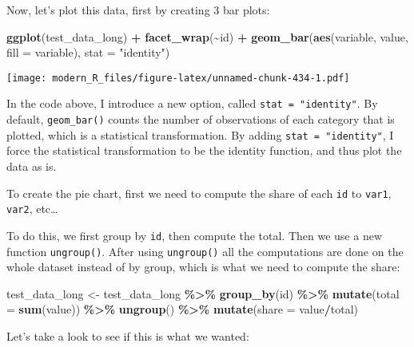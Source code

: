 \documentclass[
]{article}
\newenvironment{Shaded}{\begin{snugshade}}{\end{snugshade}}
\newcommand{\DataTypeTok}[1]{\textcolor[rgb]{0.13,0.29,0.53}{#1}}
\newcommand{\KeywordTok}[1]{\textcolor[rgb]{0.13,0.29,0.53}{\textbf{#1}}}
\newcommand{\NormalTok}[1]{#1}
\newcommand{\OperatorTok}[1]{\textcolor[rgb]{0.81,0.36,0.00}{\textbf{#1}}}
\newcommand{\StringTok}[1]{\textcolor[rgb]{0.31,0.60,0.02}{#1}}
\begin{document}
Now, let's plot this data, first by creating 3 bar plots:

\begin{Shaded}
\begin{Highlighting}[]
\KeywordTok{ggplot}\NormalTok{(test\_data\_long) }\OperatorTok{+}
\StringTok{  }\KeywordTok{facet\_wrap}\NormalTok{(}\OperatorTok{\textasciitilde{}}\NormalTok{id) }\OperatorTok{+}
\StringTok{  }\KeywordTok{geom\_bar}\NormalTok{(}\KeywordTok{aes}\NormalTok{(variable, value, }\DataTypeTok{fill =}\NormalTok{ variable), }\DataTypeTok{stat =} \StringTok{"identity"}\NormalTok{)}
\end{Highlighting}
\end{Shaded}

\texttt{[image: modern\_R\_files/figure-latex/unnamed-chunk-434-1.pdf]}

In the code above, I introduce a new option, called \texttt{stat\ =\ "identity"}. By default, \texttt{geom\_bar()} counts
the number of observations of each category that is plotted, which is a statistical transformation.
By adding \texttt{stat\ =\ "identity"}, I force the statistical transformation to be the identity function, and
thus plot the data as is.

To create the pie chart, first we need to compute the share of each \texttt{id} to \texttt{var1}, \texttt{var2}, etc\ldots{}

To do this, we first group by \texttt{id}, then compute the total. Then we use a new function \texttt{ungroup()}.
After using \texttt{ungroup()} all the computations are done on the whole dataset instead of by group, which
is what we need to compute the share:

\begin{Shaded}
\begin{Highlighting}[]
\NormalTok{test\_data\_long \textless{}{-}}\StringTok{ }\NormalTok{test\_data\_long }\OperatorTok{\%\textgreater{}\%}
\StringTok{  }\KeywordTok{group\_by}\NormalTok{(id) }\OperatorTok{\%\textgreater{}\%}
\StringTok{  }\KeywordTok{mutate}\NormalTok{(}\DataTypeTok{total =} \KeywordTok{sum}\NormalTok{(value)) }\OperatorTok{\%\textgreater{}\%}
\StringTok{  }\KeywordTok{ungroup}\NormalTok{() }\OperatorTok{\%\textgreater{}\%}
\StringTok{  }\KeywordTok{mutate}\NormalTok{(}\DataTypeTok{share =}\NormalTok{ value}\OperatorTok{/}\NormalTok{total)}
\end{Highlighting}
\end{Shaded}

Let's take a look to see if this is what we wanted:
\end{document}
